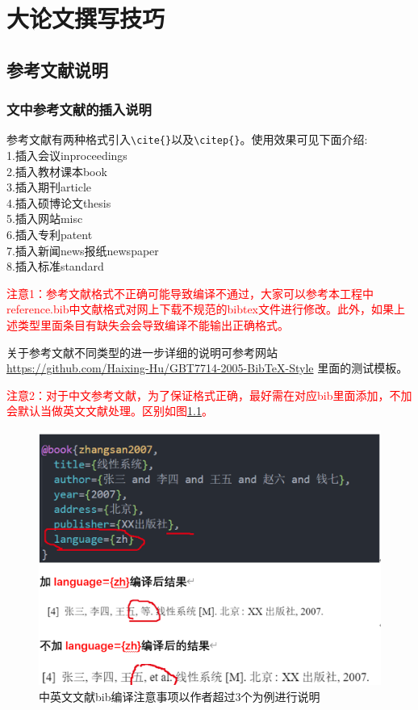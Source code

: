 \chapter{大论文撰写技巧}

\section{参考文献说明}
\subsection{文中参考文献的插入说明}
参考文献有两种格式引入\verb+\cite{}+以及\verb+\citep{}+。使用效果可见下面介绍:\\
1.插入会议inproceedings\\
2.插入教材课本book\\
3.插入期刊article\\
4.插入硕博论文thesis\\
5.插入网站misc\\
6.插入专利patent\\
7.插入新闻news报纸newspaper\\
8.插入标准standard

\textcolor{red}{注意1：参考文献格式不正确可能导致编译不通过，大家可以参考本工程中reference.bib中文献格式对网上下载不规范的bibtex文件进行修改。此外，如果上述类型里面条目有缺失会会导致编译不能输出正确格式。}

关于参考文献不同类型的进一步详细的说明可参考网站\url{https://github.com/Haixing-Hu/GBT7714-2005-BibTeX-Style}
里面的测试模板。


\textcolor{red}{注意2：对于中文参考文献，为了保证格式正确，最好需在对应bib里面添加，不加会默认当做英文文献处理。区别如图\ref{fig_bib0}。}

\begin{figure}[!htb]
  \centering
  \includegraphics[width=1\textwidth]{manual/figures/中英文文献bib编译注意事项}
  \caption{中英文文献bib编译注意事项以作者超过3个为例进行说明}
  \label{fig_bib0}
\end{figure}

